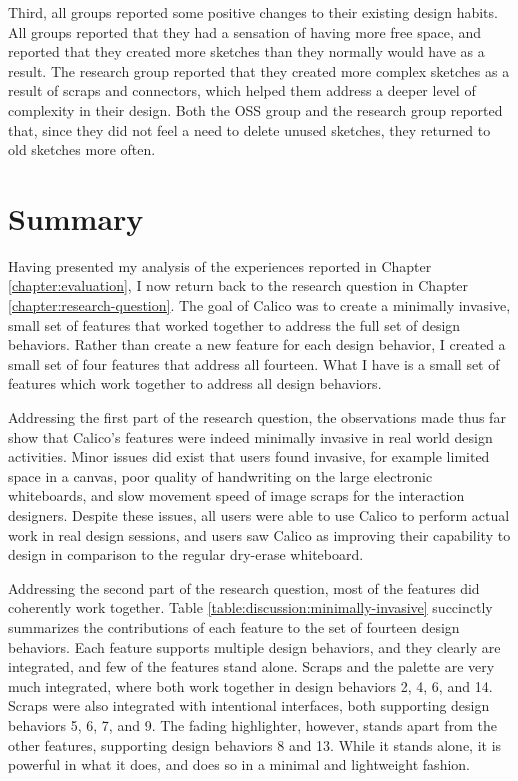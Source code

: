 Third, all groups reported some positive changes to their existing design habits. All groups reported that they had a sensation of having more free space, and reported that they created more sketches than they normally would have as a result. The research group reported that they created more complex sketches as a result of scraps and connectors, which helped them address a deeper level of complexity in their design. Both the OSS group and the research group reported that, since they did not feel a need to delete unused sketches, they returned to old sketches more often.

\section{Summary}
\label{discussion:summary}

Having presented my analysis of the experiences reported in Chapter \ref{chapter:evaluation}, I now return back to the research question in Chapter \ref{chapter:research-question}. The goal of Calico was to create a minimally invasive, small set of features that worked together to address the full set of design behaviors. Rather than create a new feature for each design behavior, I created a small set of four features that address all fourteen. What I have is a small set of features which work together to address all design behaviors.

Addressing the first part of the research question, the observations made thus far show that Calico's features were indeed minimally invasive in real world  design activities. Minor issues did exist that users found invasive, for example limited space in a canvas, poor quality of handwriting on the large electronic whiteboards, and slow movement speed of image scraps for the interaction designers. Despite these issues, all users were able to use Calico to perform actual work in real design sessions, and users saw Calico as improving their capability to design in comparison to the regular dry-erase whiteboard.

Addressing the second part of the research question, most of the features did coherently work together. Table \ref{table:discussion:minimally-invasive} succinctly summarizes the contributions of each feature to the set of fourteen design behaviors. Each feature supports multiple design behaviors, and they clearly are integrated, and few of the features stand alone. Scraps and the palette are very much integrated, where both work together in design behaviors 2, 4, 6, and 14. Scraps were also integrated with intentional interfaces, both supporting design behaviors 5, 6, 7, and 9. The fading highlighter, however, stands apart from the other features, supporting design behaviors 8 and 13. While it stands alone, it is powerful in what it does, and does so in a minimal and lightweight fashion.

